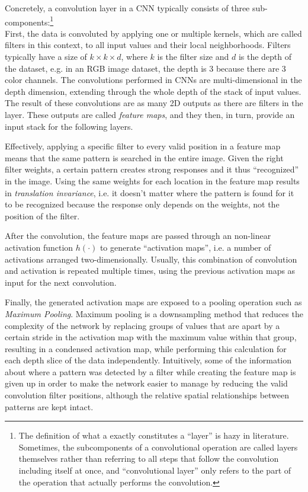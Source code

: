 \noindent Concretely, a convolution layer in a CNN typically consists of three sub-components:\footnote{The definition of what a exactly constitutes a ``layer'' is hazy in literature. Sometimes, the subcomponents of a convolutional operation are called layers themselves rather than referring to all steps that follow the convolution including itself at once, and ``convolutional layer'' only refers to the part of the operation that actually performs the convolution.}\\

\noindent First, the data is convoluted by applying one or multiple kernels, which are called filters in this context, to all input values and their local neighborhoods. Filters typically have a size of $k \times k \times d$, where $k$ is the filter size and $d$ is the depth of the dataset, e.g. in an RGB image dataset, the depth is 3 because there are 3 color channels. The convolutions performed in CNNs are multi-dimensional in the depth dimension, extending through the whole depth of the stack of input values. The result of these convolutions are as many 2D outputs as there are filters in the layer. These outputs are called \textit{feature maps}, and they then, in turn, provide an input stack for the following layers.

Effectively, applying a specific filter to every valid position in a feature map means that the same pattern is searched in the entire image. Given the right filter weights, a certain pattern creates strong responses and it thus ``recognized'' in the image. Using the same weights for each location in the feature map results in \textit{translation invariance}, i.e. it doesn't matter where the pattern is found for it to be recognized because the response only depends on the weights, not the position of the filter.

After the convolution, the feature maps are passed through an non-linear activation function $h(\cdot)$ to generate ``activation maps'', i.e. a number of activations arranged two-dimensionally. Usually, this combination of convolution and activation is repeated multiple times, using the previous activation maps as input for the next convolution.

\noindent Finally, the generated activation maps are exposed to a pooling operation such as \textit{Maximum Pooling}. Maximum pooling is a downsampling method that reduces the complexity of the network by replacing groups of values that are apart by a certain stride in the activation map with the maximum value within that group, resulting in a condensed activation map, while performing this calculation for each depth slice of the data independently. Intuitively, some of the information about where a pattern was detected by a filter while creating the feature map is given up in order to make the network easier to manage by reducing the valid convolution filter positions, although the relative spatial relationships between patterns are kept intact.

